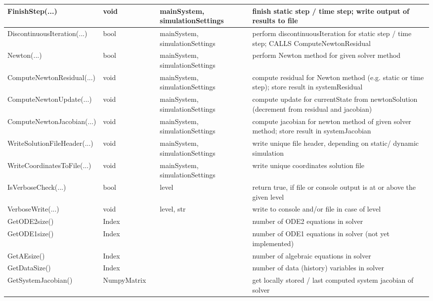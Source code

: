 \begin{center}
\begin{longtable}{| p{4.2cm} | p{2.5cm} | p{0.3cm} | p{3.0cm} | p{6cm} |}
    FinishStep(...) &     void &      &     mainSystem, simulationSettings &     finish static step / time step; write output of results to file\\ \hline
    DiscontinuousIteration(...) &     bool &      &     mainSystem, simulationSettings &     perform discontinuousIteration for static step / time step; CALLS ComputeNewtonResidual\\ \hline
    Newton(...) &     bool &      &     mainSystem, simulationSettings &     perform Newton method for given solver method\\ \hline
    ComputeNewtonResidual(...) &     void &      &     mainSystem, simulationSettings &     compute residual for Newton method (e.g. static or time step); store result in systemResidual\\ \hline
    ComputeNewtonUpdate(...) &     void &      &     mainSystem, simulationSettings &     compute update for currentState from newtonSolution (decrement from residual and jacobian)\\ \hline
    ComputeNewtonJacobian(...) &     void &      &     mainSystem, simulationSettings &     compute jacobian for newton method of given solver method; store result in systemJacobian\\ \hline
    WriteSolutionFileHeader(...) &     void &      &     mainSystem, simulationSettings &     write unique file header, depending on static/ dynamic simulation\\ \hline
    WriteCoordinatesToFile(...) &     void &      &     mainSystem, simulationSettings &     write unique coordinates solution file\\ \hline
    IsVerboseCheck(...) &     bool &      &     level &     return true, if file or console output is at or above the given level\\ \hline
    VerboseWrite(...) &     void &      &     level, str &     write to console and/or file in case of level\\ \hline
    GetODE2size() &     Index &      &      &     number of ODE2 equations in solver\\ \hline
    GetODE1size() &     Index &      &      &     number of ODE1 equations in solver (not yet implemented)\\ \hline
    GetAEsize() &     Index &      &      &     number of algebraic equations in solver\\ \hline
    GetDataSize() &     Index &      &      &     number of data (history) variables in solver\\ \hline
    GetSystemJacobian() &     NumpyMatrix &      &      &     get locally stored / last computed system jacobian of solver\\ \hline

\end{longtable}
\end{center}
